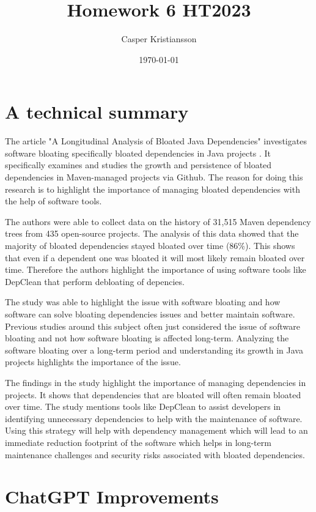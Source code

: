 \documentclass{article}
\title{Homework 6 HT2023}
\author{Casper Kristiansson}
\date{\today}
\begin{document}
\maketitle

\section{A technical summary}
The article "A Longitudinal Analysis of Bloated Java Dependencies" \cite{soltechhw4} investigates software bloating specifically bloated dependencies in Java projects \cite{soto2021comprehensive}. It specifically examines and studies the growth and persistence of bloated dependencies in Maven-managed projects via Github. The reason for doing this research is to highlight the importance of managing bloated dependencies with the help of software tools.

The authors were able to collect data on the history of 31,515 Maven dependency trees from 435 open-source projects. The analysis of this data showed that the majority of bloated dependencies stayed bloated over time (86\%). This shows that even if a dependent one was bloated it will most likely remain bloated over time. Therefore the authors highlight the importance of using software tools like DepClean that perform debloating of depencies.

The study was able to highlight the issue with software bloating and how software can solve bloating dependencies issues and better maintain software. Previous studies around this subject often just considered the issue of software bloating and not how software bloating is affected long-term. Analyzing the software bloating over a long-term period and understanding its growth in Java projects highlights the importance of the issue.

The findings in the study highlight the importance of managing dependencies in projects. It shows that dependencies that are bloated will often remain bloated over time. The study mentions tools like DepClean to assist developers in identifying unnecessary dependencies to help with the maintenance of software. Using this strategy will help with dependency management which will lead to an immediate reduction footprint of the software which helps in long-term maintenance challenges and security risks associated with bloated dependencies.




\section{ChatGPT Improvements}
\end{document}
